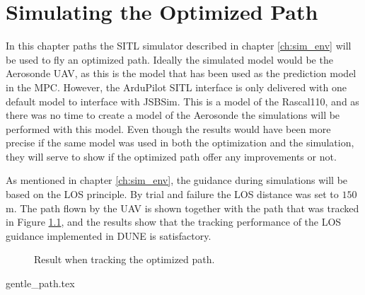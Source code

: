 \chapter{Simulating the Optimized Path}

In this chapter paths the SITL simulator described in chapter \ref{ch:sim_env} will be used to fly an optimized path. Ideally the simulated model would be the Aerosonde UAV, as this is the model that has been used as the prediction model in the MPC. However, the ArduPilot SITL interface is only delivered with one default model to interface with JSBSim. This is a model of the Rascal110, and as there was no time to create a model of the Aerosonde the simulations will be performed with this model. Even though the results would have been more precise if the same model was used in both the optimization and the simulation, they will serve to show if the optimized path offer any improvements or not.

As mentioned in chapter \ref{ch:sim_env}, the guidance during simulations will be based on the LOS principle. By trial and failure the LOS distance was set to $150$m. The path flown by the UAV is shown together with the path that was tracked in Figure \ref{fig:sim_tracking}, and the results show that the tracking performance of the LOS guidance implemented in DUNE is satisfactory.

\begin{figure}
	\caption{Result when tracking the optimized path.}
	\label{fig:sim_tracking}
\end{figure}

{gentle_path.tex}